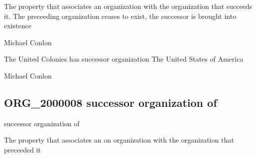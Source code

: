 \documentclass[letterpaper,10pt,english]{sphinxmanual}
\begin{document}
\begin{sphinxShadowBox}

\sphinxAtStartPar
The property that associates an organization with the organization that succeeds it.  The preceeding organization ceases to exist, the successor is brought into existence
\end{sphinxShadowBox}

\begin{sphinxShadowBox}

\sphinxAtStartPar
Michael Conlon 
\end{sphinxShadowBox}

\begin{sphinxShadowBox}

\sphinxAtStartPar
The United Colonies has successor organization The United States of America
\end{sphinxShadowBox}

\begin{sphinxShadowBox}

\sphinxAtStartPar
Michael Conlon 
\end{sphinxShadowBox}
\begin{quote}

\ignorespaces \end{quote}


\subsection{ORG\_2000008 \sphinxhyphen{} successor organization of}
\label{\detokenize{doc-ORG_2000008:org-2000008-successor-organization-of}}\label{\detokenize{doc-ORG_2000008:index-0}}\label{\detokenize{doc-ORG_2000008::doc}}
\begin{sphinxShadowBox}

\sphinxAtStartPar
successor organization of
\end{sphinxShadowBox}

\begin{sphinxShadowBox}

\sphinxAtStartPar
The property that associates an on organization with the organization that preceeded it
\end{sphinxShadowBox}
\end{document}
